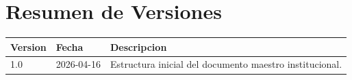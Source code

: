 
\chapter*{Resumen de Versiones}

\begin{longtable}{p{} p{} p{}}
\toprule
\textbf{Version} & \textbf{Fecha} & \textbf{Descripcion} \\
\midrule
1.0 & 2026-04-16 & Estructura inicial del documento maestro institucional. \\
\bottomrule
\end{longtable}

\tableofcontents
\listoffigures
\clearpage
